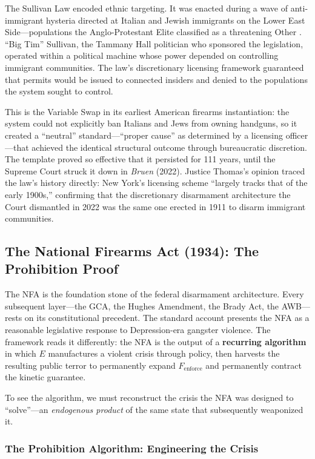 The Sullivan Law encoded ethnic targeting. It was enacted during a wave of anti-immigrant hysteria directed at Italian and Jewish immigrants on the Lower East Side---populations the Anglo-Protestant Elite classified as a threatening Other \cite{winkler2011}. ``Big Tim'' Sullivan, the Tammany Hall politician who sponsored the legislation, operated within a political machine whose power depended on controlling immigrant communities. The law's discretionary licensing framework guaranteed that permits would be issued to connected insiders and denied to the populations the system sought to control.

This is the Variable Swap in its earliest American firearms instantiation: the system could not explicitly ban Italians and Jews from owning handguns, so it created a ``neutral'' standard---``proper cause'' as determined by a licensing officer---that achieved the identical structural outcome through bureaucratic discretion. The template proved so effective that it persisted for 111 years, until the Supreme Court struck it down in \textit{Bruen} (2022). Justice Thomas's opinion traced the law's history directly: New York's licensing scheme ``largely tracks that of the early 1900s,'' confirming that the discretionary disarmament architecture the Court dismantled in 2022 was the same one erected in 1911 to disarm immigrant communities.

\subsection{The National Firearms Act (1934): The Prohibition Proof}

The NFA is the foundation stone of the federal disarmament architecture. Every subsequent layer---the GCA, the Hughes Amendment, the Brady Act, the AWB---rests on its constitutional precedent. The standard account presents the NFA as a reasonable legislative response to Depression-era gangster violence. The framework reads it differently: the NFA is the output of a \textbf{recurring algorithm} in which $E$ manufactures a violent crisis through policy, then harvests the resulting public terror to permanently expand $F_{\text{enforce}}$ and permanently contract the kinetic guarantee.

To see the algorithm, we must reconstruct the crisis the NFA was designed to ``solve''---an \textit{endogenous product} of the same state that subsequently weaponized it.

\subsubsection{The Prohibition Algorithm: Engineering the Crisis}

